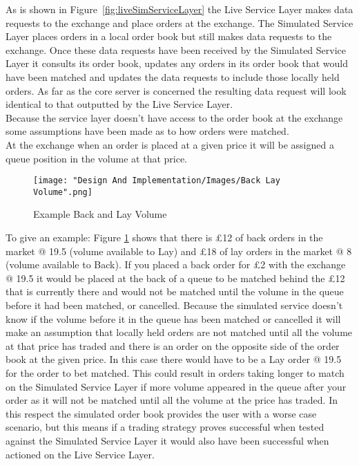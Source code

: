 		As is shown in Figure~\ref{fig:liveSimServiceLayer} the Live Service Layer makes data requests to the exchange and place orders at the exchange. The Simulated Service Layer places orders in a local order book but still makes data requests to the exchange. Once these data requests have been received by the Simulated Service Layer it consults its order book, updates any orders in its order book that would have been matched and updates the data requests to include those locally held orders. As far as the core server is concerned the resulting data request will look identical to that outputted by the Live Service Layer.\\
		
		Because the service layer doesn't have access to the order book at the exchange some assumptions have been made as to how orders were matched.\\
		
		At the exchange when an order is placed at a given price it will be assigned a queue position in the volume at that price. 
		
		\begin{figure}[H]
			\texttt{[image: "Design And Implementation/Images/Back Lay Volume".png]}
			\centering
			\caption{Example Back and Lay Volume}
    			\label{fig:backLayVolume}
		\end{figure}

		To give an example: Figure \ref{fig:backLayVolume} shows that there is \pounds12 of back orders in the market @ 19.5 (volume available to Lay) and \pounds18 of lay orders in the market @ 8 (volume available to Back). If you placed a back order for \pounds2 with the exchange @ 19.5 it would be placed at the back of a queue to be matched behind the \pounds12 that is currently there and would not be matched until the volume in the queue before it had been matched, or cancelled. Because the simulated service doesn't know if the volume before it in the queue has been matched or cancelled it will make an assumption that locally held orders are not matched until all the volume at that price has traded and there is an order on the opposite side of the order book at the given price. In this case there would have to be a Lay order @ 19.5 for the order to bet matched. This could result in orders taking longer to match on the Simulated Service Layer if more volume appeared in the queue after your order as it will not be matched until all the volume at the price has traded. In this respect the simulated order book provides the user with a worse case scenario, but this means if a trading strategy proves successful when tested against the Simulated Service Layer it would also have been successful when actioned on the Live Service Layer.\\
		
